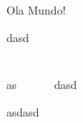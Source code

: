 \documentclass[12pt]{article}
\begin{document}
Ola Mundo!

dasd
\\\\\\
as \ \ \ \ \ \ dasd

asdasd
\end{document}
